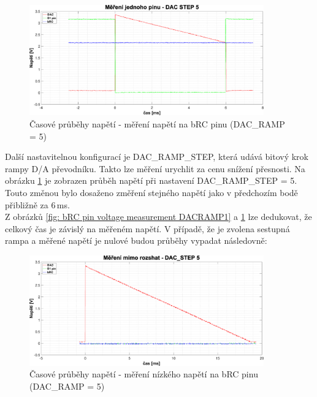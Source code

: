 \begin{figure}[ht!]
    \centering
    \includegraphics[width = 0.9\textwidth]{obrazky/matlab_generated/pin_step5.eps}
    \caption{Časové průběhy napětí - měření napětí na bRC pinu (DAC\_RAMP = 5)}
    \label{fig: bRC pin voltage measurement DACRAMP5}
\end{figure}

Další nastavitelnou konfigurací je DAC\_RAMP\_STEP, která udává bitový krok rampy D/A převodníku. Takto lze měření urychlit za cenu snížení přesnosti.
Na obrázku \ref{fig: bRC pin voltage measurement DACRAMP5} je zobrazen průběh napětí při nastavení DAC\_RAMP\_STEP = 5. Touto změnou
bylo dosaženo změření stejného napětí jako v předchozím bodě přibližně za 6\,ms.\\

Z obrázků \ref{fig: bRC pin voltage measurement DACRAMP1} a \ref{fig: bRC pin voltage measurement DACRAMP5} lze dedukovat, že celkový čas je závislý 
na měřeném napětí. V případě, že je zvolena sestupná rampa a měřené napětí je nulové budou průběhy vypadat následovně:

\begin{figure}[ht!]
    \centering
    \includegraphics[width = 0.9\textwidth]{obrazky/matlab_generated/pin_out_of_range.eps}
    \caption{Časové průběhy napětí - měření nízkého napětí na bRC pinu (DAC\_RAMP = 5)}
    \label{fig: bRC pin voltage measurement low Voltage}
\end{figure}

